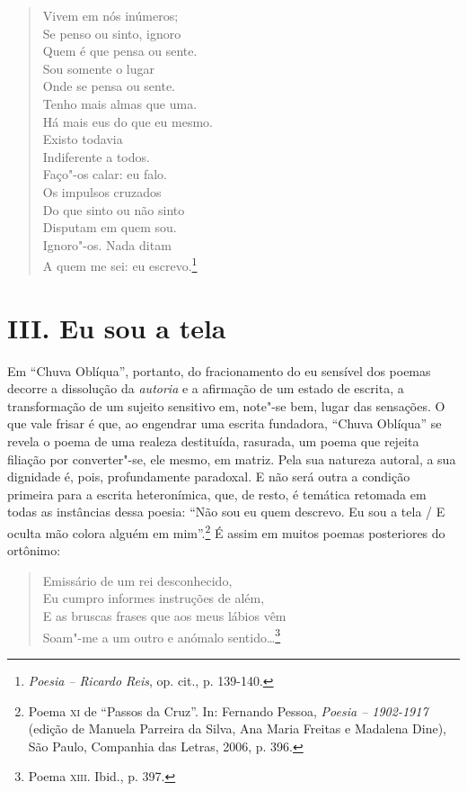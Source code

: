 \begin{verse}
Vivem em nós inúmeros;\\
Se penso ou sinto, ignoro\\
Quem é que pensa ou sente.\\
Sou somente o lugar\\
Onde se pensa ou sente.\\[5pt]
Tenho mais almas que uma.\\
Há mais eus do que eu mesmo.\\
Existo todavia\\
Indiferente a todos.\\
Faço"-os calar: eu falo.\\[5pt]
Os impulsos cruzados\\
Do que sinto ou não sinto\\
Disputam em quem sou.\\
Ignoro"-os. Nada ditam\\
A quem me sei: eu escrevo.\footnote{\emph{Poesia -- Ricardo Reis}, op.
  cit., p. 139-140.}
\end{verse}

\section*{III. Eu sou a tela}

Em ``Chuva Oblíqua'', portanto, do fracionamento do eu sensível dos
poemas decorre a dissolução da \emph{autoria} e a afirmação de um estado
de escrita, a transformação de um sujeito sensitivo em, note"-se bem,
lugar das sensações. O que vale frisar é que, ao engendrar uma escrita
fundadora, ``Chuva Oblíqua'' se revela o poema de uma realeza
destituída, rasurada, um poema que rejeita filiação por converter"-se,
ele mesmo, em matriz. Pela sua natureza autoral, a sua dignidade é,
pois, profundamente paradoxal. E não será outra a condição primeira para
a escrita heteronímica, que, de resto, é temática retomada em todas as
instâncias dessa poesia: ``Não sou eu quem descrevo. Eu sou a tela / E
oculta mão colora alguém em mim''.\footnote{Poema \textsc{xi} de
  ``Passos da Cruz''. In: Fernando Pessoa, \emph{Poesia -- 1902-1917}
  (edição de Manuela Parreira da Silva, Ana Maria Freitas e Madalena
  Dine), São Paulo, Companhia das Letras, 2006, p. 396.} É assim em
muitos poemas posteriores do ortônimo:

\begin{verse}
Emissário de um rei desconhecido,\\
Eu cumpro informes instruções de além,\\
E as bruscas frases que aos meus lábios vêm\\
Soam"-me a um outro e anómalo sentido\ldots{}\footnote{Poema \textsc{xiii}.
  Ibid., p. 397.}
\end{verse}

